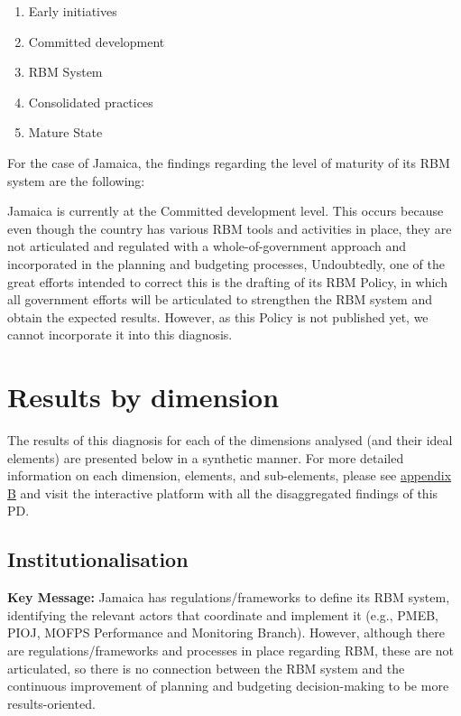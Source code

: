 \documentclass[
  10pt,
]{book}
\providecommand{\tightlist}{%
  \setlength{\itemsep}{0pt}\setlength{\parskip}{0pt}}
\begin{document}
\begin{enumerate}
\def\labelenumi{\arabic{enumi}.}
\tightlist
\item
  Early initiatives
\item
  Committed development
\item
  RBM System
\item
  Consolidated practices
\item
  Mature State
\end{enumerate}

For the case of Jamaica, the findings regarding the level of maturity of its RBM system are the following:

Jamaica is currently at the Committed development level. This occurs because even though the country has various RBM tools and activities in place, they are not articulated and regulated with a whole-of-government approach and incorporated in the planning and budgeting processes, Undoubtedly, one of the great efforts intended to correct this is the drafting of its RBM Policy, in which all government efforts will be articulated to strengthen the RBM system and obtain the expected results. However, as this Policy is not published yet, we cannot incorporate it into this diagnosis.

\hypertarget{results-by-dimension}{%
\section{Results by dimension}\label{results-by-dimension}}

The results of this diagnosis for each of the dimensions analysed (and their ideal elements) are presented below in a synthetic manner. For more detailed information on each dimension, elements, and sub-elements, please see \protect\hyperlink{appendixB}{appendix B} and visit the interactive platform with all the disaggregated findings of this PD.

\hypertarget{institutionalisation}{%
\subsection{Institutionalisation}\label{institutionalisation}}

\textbf{Key Message:}
Jamaica has regulations/frameworks to define its RBM system, identifying the relevant actors that coordinate and implement it (e.g., PMEB, PIOJ, MOFPS Performance and Monitoring Branch). However, although there are regulations/frameworks and processes in place regarding RBM, these are not articulated, so there is no connection between the RBM system and the continuous improvement of planning and budgeting decision-making to be more results-oriented.
\end{document}
